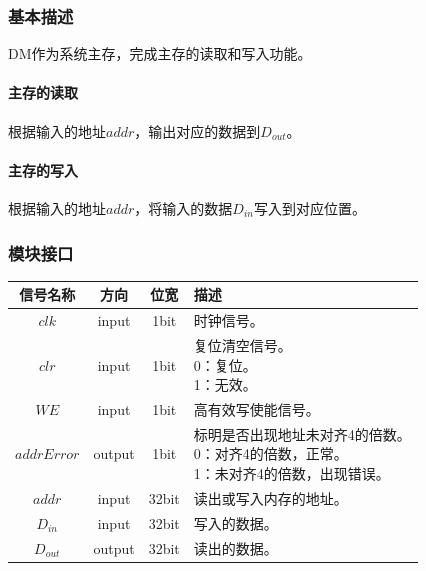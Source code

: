 \documentclass[main.tex]{subfiles}
\begin{document}
\subsubsection{基本描述}
DM作为系统主存，完成主存的读取和写入功能。
\paragraph{主存的读取}
根据输入的地址$addr$，输出对应的数据到$D_{out}$。
\paragraph{主存的写入}
根据输入的地址$addr$，将输入的数据$D_{in}$写入到对应位置。

\subsubsection{模块接口}
\begin{center}
    \begin{tabular}[]{c c c l}
        \toprule
        信号名称 & 方向 & 位宽 & 描述 \\
        \midrule
        $clk$ & input & 1bit & 时钟信号。\\
        $clr$ & input & 1bit & \makecell[lt]{
            复位清空信号。\\
             0：复位。\\
             1：无效。
        } \\
        $WE$ & input & 1bit & 高有效写使能信号。\\
        $addrError$ & output & 1bit & \makecell[lt]{
            标明是否出现地址未对齐4的倍数。\\
             0：对齐4的倍数，正常。 \\
             1：未对齐4的倍数，出现错误。
        } \\
        \midrule
        $addr$ & input & 32bit & 读出或写入内存的地址。\\
        $D_{in}$ & input & 32bit & 写入的数据。 \\
        $D_{out}$ & output & 32bit & 读出的数据。\\
        \bottomrule
    \end{tabular}
\end{center}
\end{document}
